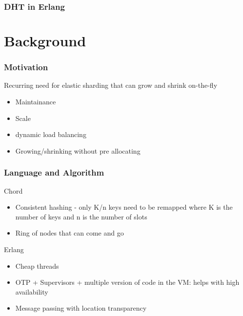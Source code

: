 \documentclass{beamer}
\author{Anoop Aryal}
\begin{document}
\begin{frame}
  \titlepage
  \frametitle{DHT in Erlang}
\end{frame}

\section{Background}
\begin{frame}
  \frametitle{Motivation}
  Recurring need for elastic sharding that can grow and shrink on-the-fly
  \begin{itemize}
  \item Maintainance
  \item Scale
  \item dynamic load balancing
  \item Growing/shrinking without pre allocating
  \end{itemize}
\end{frame}

\begin{frame}
  \frametitle{Language and Algorithm}
  Chord
  \begin{itemize}
  \item Consistent hashing - only K/n keys need to be remapped where K
    is the number of keys and n is the number of slots
  \item Ring of nodes that can come and go
  \end{itemize}

  Erlang
  \begin{itemize}
  \item Cheap threads
  \item OTP + Supervisors + multiple version of code in the VM: helps
    with high availability
  \item Message passing with location transparency
  \end{itemize}
\end{frame}
\end{document}
